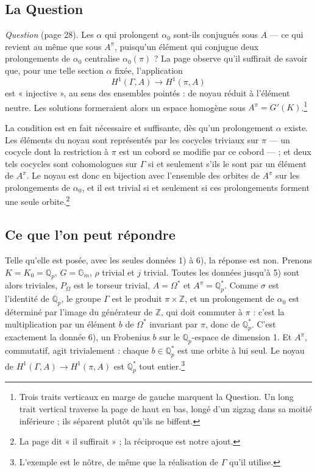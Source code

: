 \documentclass[11pt,a4paper]{article}
\begin{document}
\subsection*{La Question}

\emph{Question} (page 28). Les $\alpha$ qui prolongent $\alpha_0$ sont-ils
conjugués sous $A$ --- ce qui revient au même que sous $A^{\pi}$, puisqu'un
élément qui conjugue deux prolongements de $\alpha_0$ centralise
$\alpha_0(\pi)$ ? La page observe qu'il suffirait de savoir que, pour une
telle section $\alpha$ fixée, l'application
\[
H^1(\Gamma, A) \longrightarrow H^1(\pi, A)
\]
est « injective », au sens des ensembles pointés : de noyau réduit à
l'élément neutre. Les solutions formeraient alors un espace homogène sous
$A^{\pi} = G'(K)$.\footnote{Trois traits verticaux en marge de gauche
marquent la Question. Un long trait vertical traverse la page de haut en bas,
longé d'un zigzag dans sa moitié inférieure ; ils séparent plutôt qu'ils ne
biffent.}

La condition est en fait nécessaire et suffisante, dès qu'un prolongement
$\alpha$ existe. Les éléments du noyau sont représentés par les cocycles
triviaux sur $\pi$ --- un cocycle dont la restriction à $\pi$ est un cobord se
modifie par ce cobord --- ; et deux tels cocycles sont cohomologues sur
$\Gamma$ si et seulement s'ils le sont par un élément de $A^{\pi}$. Le noyau
est donc en bijection avec l'ensemble des orbites de $A^{\pi}$ sur les
prolongements de $\alpha_0$, et il est trivial si et seulement si ces
prolongements forment une seule orbite.\footnote{La page dit « il suffirait » ;
la réciproque est notre ajout.}

\subsection*{Ce que l'on peut répondre}

Telle qu'elle est posée, avec les seules données 1) à 6), la réponse est non.
Prenons $K = K_0 = \mathbb{Q}_p$, $G = \mathbb{G}_m$, $\rho$ trivial et $j$
trivial. Toutes les données jusqu'à 5) sont alors triviales, $P_{\Omega}$ est
le torseur trivial, $A = \Omega^{*}$ et $A^{\pi} = \mathbb{Q}_p^{*}$. Comme
$\sigma$ est l'identité de $\mathbb{Q}_p$, le groupe $\Gamma$ est le produit
$\pi \times \mathbb{Z}$, et un prolongement de $\alpha_0$ est déterminé par
l'image du générateur de $\mathbb{Z}$, qui doit commuter à $\pi$ : c'est la
multiplication par un élément $b$ de $\Omega^{*}$ invariant par $\pi$, donc de
$\mathbb{Q}_p^{*}$. C'est exactement la donnée 6), un Frobenius $b$ sur le
$\mathbb{Q}_p$-espace de dimension 1. Et $A^{\pi}$, commutatif, agit
trivialement : chaque $b \in \mathbb{Q}_p^{*}$ est une orbite à lui seul. Le
noyau de $H^1(\Gamma, A) \to H^1(\pi, A)$ est $\mathbb{Q}_p^{*}$ tout
entier.\footnote{L'exemple est le nôtre, de même que la réalisation de
$\Gamma$ qu'il utilise.}
\end{document}
